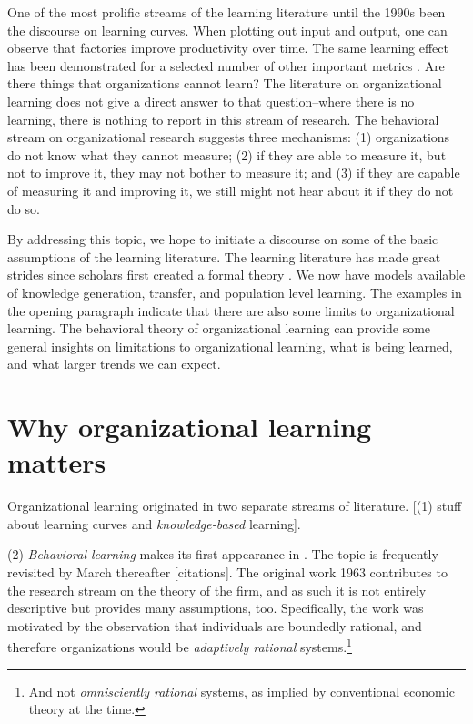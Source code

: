 \documentclass[12pt, man, natbib]{apa6}
\begin{document}
	One of the most prolific streams of the learning literature until the 1990s been the discourse on learning curves. When plotting out input and output, one can observe that factories improve productivity over time. The same learning effect has been demonstrated for a selected number of other important metrics \citep{Argote2013a}. Are there things that organizations cannot learn? The literature on organizational learning does not give a direct answer to that question--where there is no learning, there is nothing to report in this stream of research. The behavioral stream on organizational research suggests three mechanisms: (1) organizations do not know what they cannot measure; (2) if they are able to measure it, but not to improve it, they may not bother to measure it; and (3) if they are capable of measuring it and improving it, we still might not hear about it if they do not do so.
	
	By addressing this topic, we hope to initiate a discourse on some of the basic assumptions of the learning literature. The learning literature has made great strides since scholars first created a formal theory \citep{March1963}. We now have models available of knowledge generation, transfer, and population level learning. The examples in the opening paragraph indicate that there are also some limits to organizational learning. The behavioral theory of organizational learning can provide some general insights on limitations to organizational learning, what is being learned, and what larger trends we can expect.
	
	\section{Why organizational learning matters}
	
	Organizational learning originated in two separate streams of literature. [(1) stuff about learning curves and \textit{knowledge-based} learning].
	
	(2) \textit{Behavioral learning} makes its first appearance in \citet{March1963}. The topic is frequently revisited by March thereafter [citations]. The original work 1963 contributes to the research stream on the theory of the firm, and as such it is not entirely descriptive but provides many assumptions, too. Specifically, the work was motivated by the observation that individuals are boundedly rational, and therefore organizations would be \textit{adaptively rational} systems.\footnote{And not \textit{omnisciently rational} systems, as implied by conventional economic theory at the time.}
	
\end{document}
